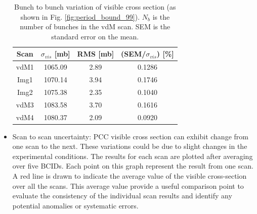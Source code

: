 \begin{itemize}

\begin{table}[!htp]
  \centering
  \caption[Bunch uncertainty]{Bunch to bunch variation of visible cross section (as shown in Fig. \ref{fig:period_bound_99}). $N_b$ is the number of bunches in the vdM scan. SEM is the standard error on the mean.}
\begin{tabular}{cccc}
\textbf{Scan} & \textbf{$\sigma_{vis}$ [mb]} & \textbf{RMS [mb]} & (SEM/$\sigma_{vis}$) [\%] \\
\hline
vdM1 & 1065.09 & 2.89 & 0.1286 \\
Img1 & 1070.14 & 3.94 & 0.1746 \\
Img2 & 1075.38 & 2.35 & 0.1040 \\
vdM3 & 1083.58 & 3.70 & 0.1616 \\
vdM4 & 1080.37 & 2.09 & 0.0920 \\
\end{tabular}
\label{tab:my_label}
\end{table}


\newpage
\item Scan to scan uncertainty: PCC visible cross section can exhibit change from one scan to the next. These variations could be due to slight changes in the experimental conditions. The results for each scan are plotted after averaging over five BCIDs. Each point on this graph represent the result from one scan. A red line is drawn to indicate the average value of the visible cross-section over all the scans. This average value provide a useful comparison point to evaluate the consistency of the individual scan results and identify any potential anomalies or systematic errors.


\end{itemize}
